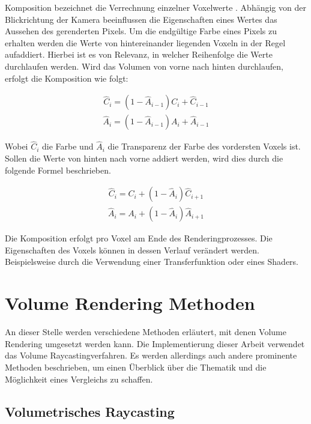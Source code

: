 Komposition bezeichnet die Verrechnung einzelner Voxelwerte \cite{Fernando04}. Abhängig von der Blickrichtung der Kamera beeinflussen die Eigenschaften eines Wertes das Aussehen des gerenderten Pixels. Um die endgültige Farbe eines Pixels zu erhalten werden die Werte von hintereinander liegenden Voxeln in der Regel aufaddiert. Hierbei ist es von Relevanz, in welcher Reihenfolge die Werte durchlaufen werden. Wird das Volumen von vorne nach hinten durchlaufen, erfolgt die Komposition wie folgt:

\begin{align}
\hat{C}_{i}=(1-\hat{A}_{i-1})C_{i}+\hat{C}_{i-1}
\end{align}
\begin{align}
\hat{A}_{i}=(1-\hat{A}_{i-1})A_{i}+\hat{A}_{i-1}
\end{align}


Wobei $\hat{C}_{i}$ die Farbe und $\hat{A}_{i}$ die Transparenz der Farbe des vordersten Voxels ist.
Sollen die Werte von hinten nach vorne addiert werden, wird dies durch die folgende Formel beschrieben.

\begin{align}
\hat{C}_{i}=C_{i}+(1-\hat{A}_{i})\hat{C}_{i+1}
\end{align}
\begin{align}
\hat{A}_{i}=A_{i}+(1-\hat{A}_{i})\hat{A}_{i+1}
\end{align}

Die Komposition erfolgt pro Voxel am Ende des Renderingprozesses. Die Eigenschaften des Voxels können in dessen Verlauf verändert werden. Beispielsweise durch die Verwendung einer Transferfunktion oder eines Shaders.


\section{Volume Rendering Methoden}

An dieser Stelle werden verschiedene Methoden erläutert, mit denen Volume Rendering umgesetzt werden kann. Die Implementierung dieser Arbeit verwendet das Volume Raycastingverfahren. Es werden allerdings auch andere prominente Methoden beschrieben, um einen Überblick über die Thematik und die Möglichkeit eines Vergleichs zu schaffen.

\pagebreak
\subsection{Volumetrisches Raycasting}
\label{rayCasting}

